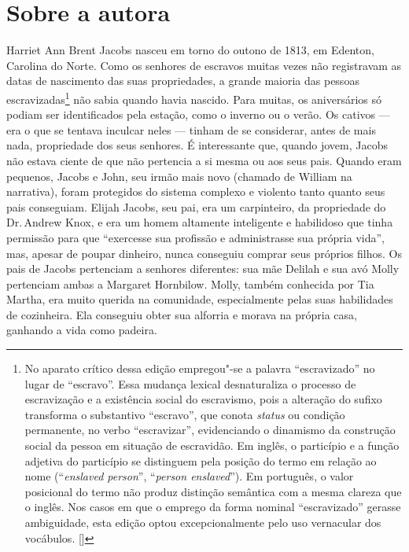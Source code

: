 
\section{Sobre a autora}

Harriet Ann Brent Jacobs nasceu em torno do outono de 1813, em Edenton,
Carolina do Norte. Como os senhores de escravos muitas vezes não
registravam as datas de nascimento das suas propriedades, a grande
maioria das pessoas escravizadas\footnote{No aparato crítico dessa edição empregou"-se a palavra ``escravizado'' no lugar de ``escravo''. Essa mudança lexical desnaturaliza o processo de escravização e a existência social do escravismo, pois a alteração do sufixo transforma o substantivo ``escravo'', que conota \emph{status} ou condição permanente, no verbo ``escravizar'', evidenciando o dinamismo da construção social da pessoa em situação de escravidão. Em inglês, o particípio e a função adjetiva do particípio se distinguem pela posição do termo em relação ao nome (``\emph{enslaved person}'', ``\emph{person enslaved}''). Em português, o valor posicional do termo não produz distinção semântica com a mesma clareza que o inglês. Nos casos em que o emprego da forma nominal ``escravizado'' gerasse ambiguidade, esta edição optou excepcionalmente pelo uso vernacular dos vocábulos. []} não sabia quando havia nascido. Para
muitas, os aniversários só podiam ser identificados pela estação, como o
inverno ou o verão. Os cativos --- era o que se tentava inculcar neles --- tinham de se considerar, antes de mais nada, propriedade dos seus senhores. É interessante que,
quando jovem, Jacobs não estava ciente de que não pertencia a si mesma
ou aos seus pais. Quando eram pequenos, Jacobs e John, seu irmão mais
novo (chamado de William na narrativa), foram protegidos do sistema
complexo e violento tanto quanto seus pais conseguiam. Elijah Jacobs,
seu pai, era um carpinteiro, da propriedade do Dr.\,Andrew Knox, e
era um homem altamente inteligente e habilidoso que
tinha permissão para que ``exercesse sua profissão e administrasse
sua própria vida'', mas, apesar de poupar dinheiro, nunca conseguiu
comprar seus próprios filhos. Os pais de Jacobs pertenciam a
senhores diferentes: sua mãe Delilah e sua avó Molly pertenciam ambas a
Margaret Hornbilow. Molly, também conhecida por Tia Martha, era muito
querida na comunidade, especialmente pelas suas habilidades de
cozinheira. Ela conseguiu obter sua alforria e morava na própria casa,
ganhando a vida como padeira.

